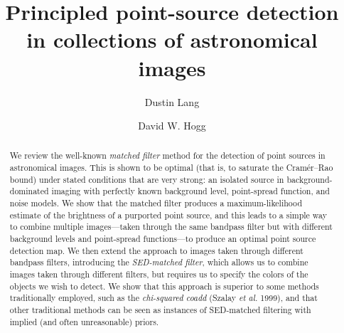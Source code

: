 \documentclass[letterpaper,preprint]{aastex62}
\newcounter{address}
\begin{document}
\title{Principled point-source detection in collections of astronomical images}
\author{Dustin Lang}

\author{David W. Hogg}


\begin{abstract}
We review the well-known \emph{matched filter} method for the
detection of point sources in astronomical images.  This is shown to
be optimal (that is, to saturate the Cram\'er--Rao bound) under stated
conditions that are very strong: an isolated source in
background-dominated imaging with perfectly known background level,
point-spread function, and noise models.  We show that the matched
filter produces a maximum-likelihood estimate of the brightness of a
purported point source, and this leads to a simple way to combine
multiple images---taken through the same bandpass filter but with
different background levels and point-spread functions---to produce an
optimal point source detection map.  We then extend the approach to
images taken through different bandpass filters, introducing the
\emph{SED-matched filter}, which allows us to combine images taken
through different filters, but requires us to specify the colors of
the objects we wish to detect.  We show that this approach is superior
to some methods traditionally employed, such as the \emph{chi-squared
  coadd} (Szalay \emph{et al.} 1999), and that other traditional
methods can be seen as instances of SED-matched filtering with implied
(and often unreasonable) priors.
%
%
\end{abstract}
\end{document}
